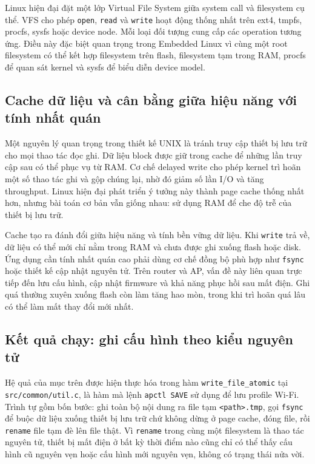 \documentclass[11pt]{article}
\newcommand{\code}[1]{\texttt{#1}}
\begin{document}
Linux hiện đại đặt một lớp Virtual File System giữa system call và filesystem cụ thể. VFS cho phép \code{open}, \code{read} và \code{write} hoạt động thống nhất trên ext4, tmpfs, procfs, sysfs hoặc device node. Mỗi loại đối tượng cung cấp các operation tương ứng. Điều này đặc biệt quan trọng trong Embedded Linux vì cùng một root filesystem có thể kết hợp filesystem trên flash, filesystem tạm trong RAM, procfs để quan sát kernel và sysfs để biểu diễn device model.

\subsection{Cache dữ liệu và cân bằng giữa hiệu năng với tính nhất quán}

Một nguyên lý quan trọng trong thiết kế UNIX là tránh truy cập thiết bị lưu trữ cho mọi thao tác đọc ghi. Dữ liệu block được giữ trong cache để những lần truy cập sau có thể phục vụ từ RAM. Cơ chế delayed write cho phép kernel trì hoãn một số thao tác ghi và gộp chúng lại, nhờ đó giảm số lần I/O và tăng throughput. Linux hiện đại phát triển ý tưởng này thành page cache thống nhất hơn, nhưng bài toán cơ bản vẫn giống nhau: sử dụng RAM để che độ trễ của thiết bị lưu trữ.

Cache tạo ra đánh đổi giữa hiệu năng và tính bền vững dữ liệu. Khi \code{write} trả về, dữ liệu có thể mới chỉ nằm trong RAM và chưa được ghi xuống flash hoặc disk. Ứng dụng cần tính nhất quán cao phải dùng cơ chế đồng bộ phù hợp như \code{fsync} hoặc thiết kế cập nhật nguyên tử. Trên router và AP, vấn đề này liên quan trực tiếp đến lưu cấu hình, cập nhật firmware và khả năng phục hồi sau mất điện. Ghi quá thường xuyên xuống flash còn làm tăng hao mòn, trong khi trì hoãn quá lâu có thể làm mất thay đổi mới nhất.

\subsection{Kết quả chạy: ghi cấu hình theo kiểu nguyên tử}

Hệ quả của mục trên được hiện thực hóa trong hàm \code{write\_file\_atomic} tại \code{src/common/util.c}, là hàm mà lệnh \code{apctl SAVE} sử dụng để lưu profile Wi-Fi. Trình tự gồm bốn bước: ghi toàn bộ nội dung ra file tạm \code{<path>.tmp}, gọi \code{fsync} để buộc dữ liệu xuống thiết bị lưu trữ chứ không dừng ở page cache, đóng file, rồi \code{rename} file tạm đè lên file thật. Vì \code{rename} trong cùng một filesystem là thao tác nguyên tử, thiết bị mất điện ở bất kỳ thời điểm nào cũng chỉ có thể thấy cấu hình cũ nguyên vẹn hoặc cấu hình mới nguyên vẹn, không có trạng thái nửa vời.
\end{document}
